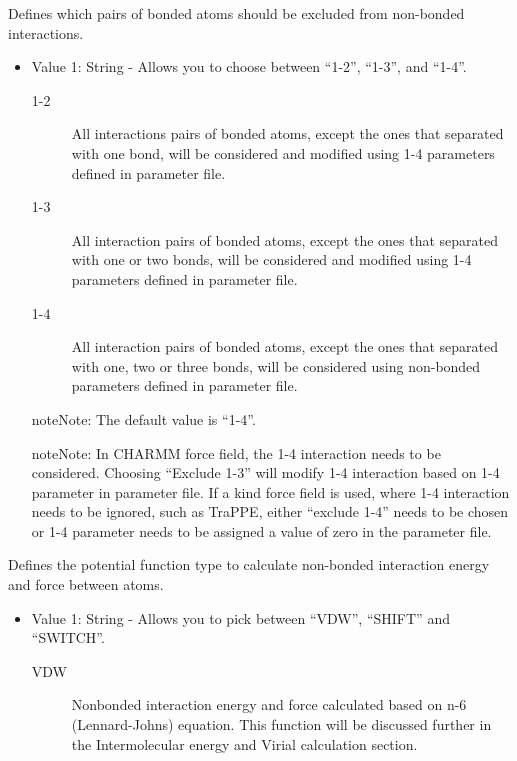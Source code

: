 \documentclass[letterpaper,10pt,english]{sphinxmanual}
\begin{document}
\begin{description}
\begin{itemize}
\end{itemize}

\item[{\sphinxcode{\sphinxupquote{Exclude}}}] \leavevmode
Defines which pairs of bonded atoms should be excluded from non-bonded interactions.
\begin{itemize}
\item {} 
Value 1: String - Allows you to choose between “1-2”, “1-3”, and “1-4”.
\begin{description}
\item[{1-2}] \leavevmode
All interactions pairs of bonded atoms, except the ones that separated with one bond, will be considered and modified using 1-4 parameters defined in parameter file.

\item[{1-3}] \leavevmode
All interaction pairs of bonded atoms, except the ones that separated with one or two bonds, will be considered and modified using 1-4 parameters defined in parameter file.

\item[{1-4}] \leavevmode
All interaction pairs of bonded atoms, except the ones that separated with one, two or three bonds, will be considered using non-bonded parameters defined in parameter file.

\end{description}

\begin{sphinxadmonition}{note}{Note:}
The default value is “1-4”.
\end{sphinxadmonition}

\begin{sphinxadmonition}{note}{Note:}
In CHARMM force field, the 1-4 interaction needs to be considered. Choosing “Exclude 1-3” will modify 1-4 interaction based on 1-4 parameter in parameter file. If a kind force field is used, where 1-4 interaction needs to be ignored, such as TraPPE, either “exclude 1-4” needs to be chosen or 1-4 parameter needs to be assigned a value of zero in the parameter file.
\end{sphinxadmonition}

\end{itemize}

\item[{\sphinxcode{\sphinxupquote{Potential}}}] \leavevmode
Defines the potential function type to calculate non-bonded interaction energy and force between atoms.
\begin{itemize}
\item {} 
Value 1: String - Allows you to pick between “VDW”, “SHIFT” and “SWITCH”.
\begin{description}
\item[{VDW}] \leavevmode
Nonbonded interaction energy and force calculated based on n-6 (Lennard-Johns) equation. This function will be discussed further in the Intermolecular energy and Virial calculation section.


\end{description}
\end{itemize}
\end{description}
\end{document}
